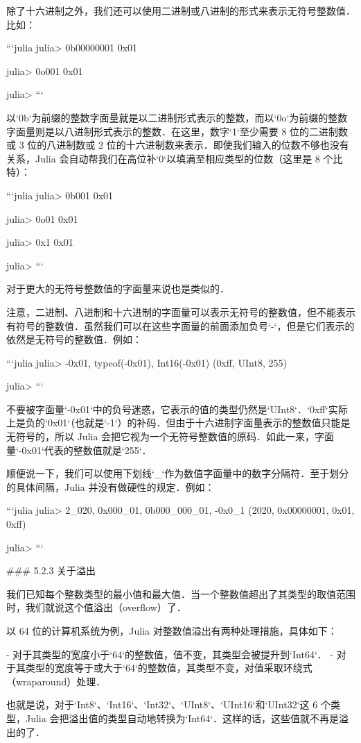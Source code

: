 除了十六进制之外，我们还可以使用二进制或八进制的形式来表示无符号整数值．比如：

```julia
julia> 0b00000001
0x01

julia> 0o001
0x01

julia> 
```

以`0b`为前缀的整数字面量就是以二进制形式表示的整数，而以`0o`为前缀的整数字面量则是以八进制形式表示的整数．在这里，数字`1`至少需要 8 位的二进制数或 3 位的八进制数或 2 位的十六进制数来表示．即使我们输入的位数不够也没有关系，Julia 会自动帮我们在高位补`0`以填满至相应类型的位数（这里是 8 个比特）：

```julia
julia> 0b001
0x01

julia> 0o01
0x01

julia> 0x1
0x01

julia>
```

对于更大的无符号整数值的字面量来说也是类似的．

注意，二进制、八进制和十六进制的字面量可以表示无符号的整数值，但不能表示有符号的整数值．虽然我们可以在这些字面量的前面添加负号`-`，但是它们表示的依然是无符号的整数值．例如：

```julia
julia> -0x01, typeof(-0x01), Int16(-0x01)
(0xff, UInt8, 255)

julia> 
```

不要被字面量`-0x01`中的负号迷惑，它表示的值的类型仍然是`UInt8`．`0xff`实际上是负的`0x01`（也就是`-1`）的补码．但由于十六进制字面量表示的整数值只能是无符号的，所以 Julia 会把它视为一个无符号整数值的原码．如此一来，字面量`-0x01`代表的整数值就是`255`．

顺便说一下，我们可以使用下划线`_`作为数值字面量中的数字分隔符．至于划分的具体间隔，Julia 并没有做硬性的规定．例如：

```julia
julia> 2_020, 0x000_01, 0b000_000_01, -0x0_1
(2020, 0x00000001, 0x01, 0xff)

julia> 
```

### 5.2.3 关于溢出

我们已知每个整数类型的最小值和最大值．当一个整数值超出了其类型的取值范围时，我们就说这个值溢出（overflow）了．

以 64 位的计算机系统为例，Julia 对整数值溢出有两种处理措施，具体如下：

- 对于其类型的宽度小于`64`的整数值，值不变，其类型会被提升到`Int64`．
- 对于其类型的宽度等于或大于`64`的整数值，其类型不变，对值采取环绕式（wraparound）处理．

也就是说，对于`Int8`、`Int16`、`Int32`‌、`UInt8`、`UInt16`和`UInt32`这 6 个类型，Julia 会把溢出值的类型自动地转换为`Int64`．这样的话，这些值就不再是溢出的了．

